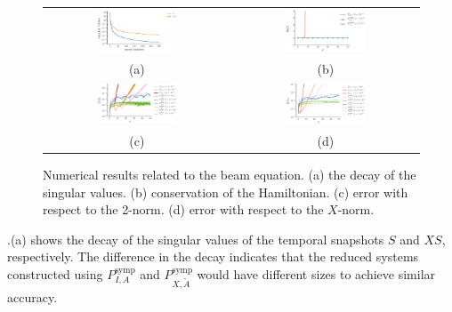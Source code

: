 \begin{figure}[t] 
\begin{tabular}{cc}
\includegraphics[width=0.45\textwidth]{./images/paper2/beam/singulars} & \includegraphics[width=0.45\textwidth]{./images/paper2/beam/energy} \\
(a) & (b) \\
\includegraphics[width=0.45\textwidth]{./images/paper2/beam/l2_norm} & \includegraphics[width=0.45\textwidth]{./images/paper2/beam/energy_norm} \\
(c) & (d) \\
\end{tabular}
\caption{Numerical results related to the beam equation. (a) the decay of the singular values. (b) conservation of the Hamiltonian. (c) error with respect to the 2-norm. (d) error with respect to the $X$-norm.} \label{fig:1}
\end{figure}

.(a) shows the decay of the singular values of the temporal snapshots $S$ and $XS$, respectively. The difference in the decay indicates that the reduced systems constructed using $P_{I,A}^{\text{symp}}$ and $P_{X,\tilde A}^{\text{symp}}$ would have different sizes to achieve similar accuracy.

